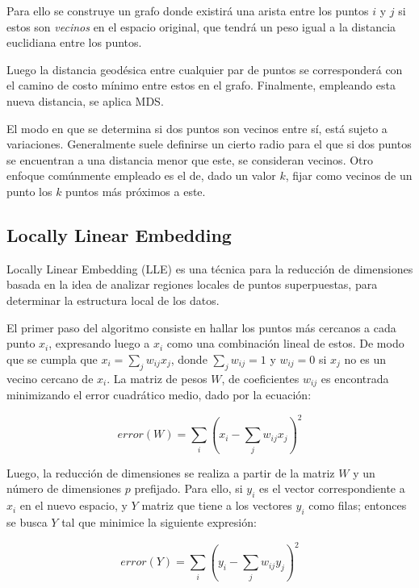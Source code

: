 Para ello se construye un grafo donde existirá una arista entre los puntos $i$ y $j$ si estos son \textit{vecinos} en el espacio original, que tendrá un peso igual a la distancia euclidiana entre los puntos.

Luego la distancia geodésica entre cualquier par de puntos se corresponderá con el camino de costo mínimo entre estos en el grafo.
Finalmente, empleando esta nueva distancia, se aplica MDS\@.

El modo en que se determina si dos puntos son vecinos entre sí, está sujeto a variaciones.
Generalmente suele definirse un cierto radio para el que si dos puntos se encuentran a una distancia menor que este, se consideran vecinos.
Otro enfoque comúnmente empleado es el de, dado un valor $k$, fijar como vecinos de un punto los $k$ puntos más próximos a este.

\subsection{Locally Linear Embedding}\label{subsec:LLE}

Locally Linear Embedding (LLE) es una técnica para la reducción de dimensiones basada en la idea de analizar regiones locales de puntos superpuestas, para determinar la estructura local de los datos.

El primer paso del algoritmo consiste en hallar los puntos más cercanos a cada punto $x_i$, expresando luego a $x_i$ como una combinación lineal de estos.
De modo que se cumpla que $x_i =\sum_j {w_{ij}x_j}$, donde $\sum_j w_{ij}=1$ y $w_{ij} = 0$ si $x_j$ no es un vecino cercano de $x_i$.
La matriz de pesos $W$, de coeficientes $w_{ij}$ es encontrada minimizando el error cuadrático medio, dado por la ecuación:

\begin{equation}
    error(W) = \sum_i \left( x_i - \sum_j {w_{ij}x_j} \right)^2
\end{equation}

Luego, la reducción de dimensiones se realiza a partir de la matriz $W$ y un número de dimensiones $p$ prefijado.
Para ello, si $y_i$ es el vector correspondiente a $x_i$ en el nuevo espacio, y $Y$ matriz que tiene a los vectores $y_i$ como filas;
entonces se busca $Y$ tal que minimice la siguiente expresión:

\begin{equation}
    error(Y) = \sum_i \left( y_i - \sum_j {w_{ij}y_j} \right)^2
\end{equation}

